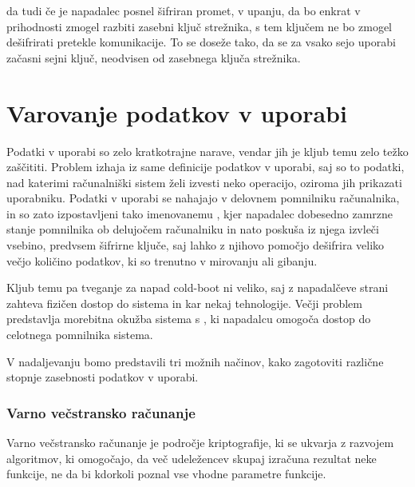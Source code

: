 \documentclass[12pt,a4paper,openany,tikz]{book}
\theoremstyle{plain}
\theoremstyle{definition}
\begin{document}
da tudi če je napadalec posnel šifriran promet, v upanju, da bo enkrat v prihodnosti zmogel razbiti zasebni ključ strežnika, s tem ključem ne bo zmogel dešifrirati pretekle komunikacije. To se doseže tako, da se za vsako sejo uporabi začasni sejni ključ, neodvisen od zasebnega ključa strežnika.


\section{Varovanje podatkov v uporabi}
\label{sec:Varovanje podatkov v uporabi}

Podatki v uporabi so zelo kratkotrajne narave, vendar jih je kljub temu zelo težko zaščititi. Problem izhaja iz same definicije podatkov v uporabi, saj so to podatki, nad katerimi računalniški sistem želi izvesti neko operacijo, oziroma jih prikazati uporabniku. Podatki v uporabi se nahajajo v delovnem pomnilniku računalnika, in so zato izpostavljeni tako imenovanemu , kjer napadalec dobesedno zamrzne stanje pomnilnika ob delujočem računalniku in nato poskuša iz njega izvleči vsebino, predvsem šifrirne ključe, saj lahko z njihovo pomočjo dešifrira veliko večjo količino podatkov, ki so trenutno v mirovanju ali gibanju.

Kljub temu pa tveganje za napad cold-boot ni veliko, saj z napadalčeve strani zahteva fizičen dostop do sistema in kar nekaj tehnologije. Večji problem predstavlja morebitna okužba sistema s , ki napadalcu omogoča dostop do celotnega pomnilnika sistema.

V nadaljevanju bomo predstavili tri možnih načinov, kako zagotoviti različne stopnje zasebnosti podatkov v uporabi.

\subsubsection{Varno večstransko računanje}
\label{subs:Varno večstransko računanje}

Varno večstransko računanje je področje kriptografije, ki se ukvarja z razvojem algoritmov, ki omogočajo, da več udeležencev skupaj izračuna rezultat neke funkcije, ne da bi kdorkoli poznal vse vhodne parametre funkcije.

\newpage


\listoffigures

\newpage

\listoftables




\newpage
\nocite{*}

\label{literatura}

\end{document}
